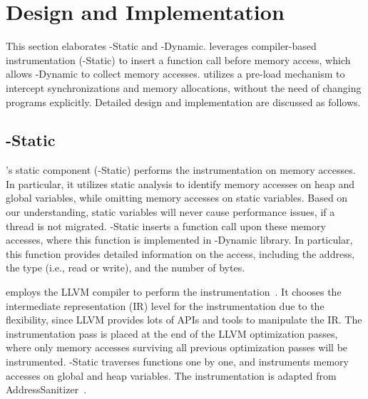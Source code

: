 \section{Design and Implementation}
\label{sec:implementation}

This section elaborates \NP{}-Static and \NP{}-Dynamic. \NP{} leverages compiler-based instrumentation (\NP{}-Static) to insert a function call before memory access, which allows \NP{}-Dynamic to collect memory accesses. \NP{} utilizes a pre-load mechanism to intercept synchronizations and memory allocations, without the need of changing programs explicitly. Detailed design and implementation are discussed as follows. 

\begin{comment}
\NP{} leverages compiler-based instrumentation to insert a handle function for each memory access. This allows \NP{} to collect memory accesses.
how the memory is accessed in both page and cache level, and collect the sharing pattern when the memory object is freed by users.If they are never freed explicitly, \NP{} can do the collection in the end of the whole application. If too many remote memory access happened in a memory object, it needs an attention. Besides, \NP{} also collected thread based information like how many thread migration happened, how many different thread groups, and how many local and remote memory access incurred in each thread.Based on these thread based information, \NP{} could tell users what kinds of NUMA imbalance issues the application contained and how to fix it.

\end{comment}

\subsection{\NP{}-Static} 
\NP{}'s static component (\NP{}-Static) performs the instrumentation on memory accesses. In particular, it utilizes static analysis to identify memory accesses on heap and global variables, while omitting memory accesses on static variables. Based on our understanding, static variables will never cause performance issues, if a thread is not migrated. \NP{}-Static inserts a function call 
upon these memory accesses, where this function is implemented in \NP{}-Dynamic library. In particular, this function provides detailed information on the access, including the address, the type  (i.e., read or write), and the number of bytes.  

\NP{} employs the LLVM compiler to perform the instrumentation~\cite{llvm}. It chooses the intermediate  representation (IR) level for the instrumentation due to the flexibility, since LLVM provides lots of APIs and tools to manipulate the IR. The instrumentation pass is placed at the end of the LLVM optimization passes, where only memory accesses surviving all previous optimization passes will be instrumented.  \NP{}-Static traverses functions one by one, and instruments memory accesses on global and heap variables. The instrumentation is adapted from AddressSanitizer~\cite{AddressSanitizer}.

